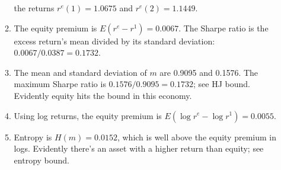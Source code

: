 \documentclass[11pt]{article}
\begin{document}
\begin{enumerate}
\begin{enumerate}
the returns $r^e(1) =   1.0675 $ and $ r^e(2) =  1.1449 $.
\item The equity premium is $ E(r^e-r^1) =  0.0067$.
The Sharpe ratio is the excess return's mean divided by its standard deviation:
$ 0.0067/0.0387 = 0.1732$.
\item The mean and standard deviation of $m$ are 0.9095 and 0.1576.
The maximum Sharpe ratio is $ 0.1576 /0.9095 = 0.1732$; see HJ bound.
Evidently equity hits the bound in this economy.
\item Using log returns, the equity premium is
$ E(\log r^e- \log r^1) =  0.0055$.
\item Entropy is $H(m) = 0.0152$,
which is well above the equity premium in logs.
Evidently there's an asset with a higher return than equity;
see entropy bound.
\end{enumerate}


\end{enumerate}
\end{document}
